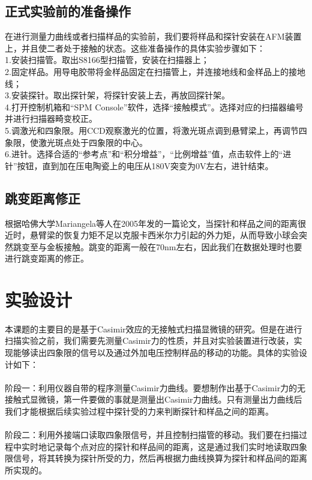 \subsection{正式实验前的准备操作}
在进行测量力曲线或者扫描样品的实验前，我们要将样品和探针安装在AFM装置上，并且使二者处于接触的状态。这些准备操作的具体实验步骤如下：\\
1.安装扫描管。取出S8166型扫描管，安装在扫描器上；\\
2.固定样品。用导电胶带将金样品固定在扫描管上，并连接地线和金样品上的接地线；\\
3.安装探针。取出探针架，将探针安装上去，再放回探针架。\\
4.打开控制机箱和“SPM Console”软件，选择“接触模式”。选择对应的扫描器编号并进行扫描器畸变校正。\\
5.调激光和四象限。用CCD观察激光的位置，将激光斑点调到悬臂梁上，再调节四象限，使激光斑点处于四象限的中心。\\
6.进针。选择合适的“参考点”和“积分增益”，“比例增益”值，点击软件上的“进针”按钮，直到加在压电陶瓷上的电压从180V突变为0V左右，进针结束。
\subsection{跳变距离修正}
根据哈佛大学Mariangela等人在2005年发的一篇论文\cite{Mariangela_2005}，当探针和样品之间的距离很近时，悬臂梁的恢复力矩不足以克服卡西米尔力引起的外力矩，从而导致小球会突然跳变至与金板接触。跳变的距离一般在70nm左右，因此我们在数据处理时也要进行跳变距离的修正。
\section{实验设计}
\paragraph*{}
本课题的主要目的是基于Casimir效应的无接触式扫描显微镜的研究。但是在进行扫描实验之前，我们需要先测量Casimir力的性质，并且对实验装置进行改装，实现能够读出四象限的信号以及通过外加电压控制样品的移动的功能。具体的实验设计如下：
\paragraph*{}阶段一：利用仪器自带的程序测量Casimir力曲线。要想制作出基于Casimir力的无接触式显微镜，第一件要做的事就是测量出Casimir力曲线。只有测量出力曲线后我们才能根据后续实验过程中探针受的力来判断探针和样品之间的距离。
\paragraph*{}阶段二：利用外接端口读取四象限信号，并且控制扫描管的移动。我们要在扫描过程中实时地记录每个点对应的探针和样品间的距离，这是通过我们实时地读取四象限信号，将其转换为探针所受的力，然后再根据力曲线换算为探针和样品间的距离所实现的。
